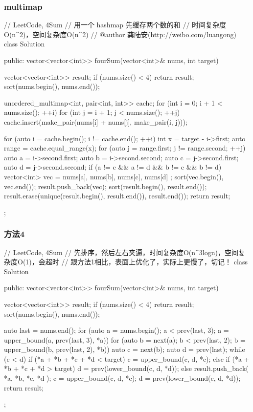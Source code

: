 \subsubsection{multimap}
\begin{Code}
// LeetCode, 4Sum
// 用一个 hashmap 先缓存两个数的和
// 时间复杂度O(n^2)，空间复杂度O(n^2)
// @author 龚陆安(http://weibo.com/luangong)
class Solution {
public:
    vector<vector<int>> fourSum(vector<int>& nums, int target) {
        vector<vector<int>> result;
        if (nums.size() < 4) return result;
        sort(nums.begin(), nums.end());

        unordered_multimap<int, pair<int, int>> cache;
        for (int i = 0; i + 1 < nums.size(); ++i)
            for (int j = i + 1; j < nums.size(); ++j)
                cache.insert(make_pair(nums[i] + nums[j], make_pair(i, j)));

        for (auto i = cache.begin(); i != cache.end(); ++i) {
            int x = target - i->first;
            auto range = cache.equal_range(x);
            for (auto j = range.first; j != range.second; ++j) {
                auto a = i->second.first;
                auto b = i->second.second;
                auto c = j->second.first;
                auto d = j->second.second;
                if (a != c && a != d && b != c && b != d) {
                    vector<int> vec = { nums[a], nums[b], nums[c], nums[d] };
                    sort(vec.begin(), vec.end());
                    result.push_back(vec);
                }
            }
        }
        sort(result.begin(), result.end());
        result.erase(unique(result.begin(), result.end()), result.end());
        return result;
    }
};
\end{Code}


\subsubsection{方法4}
\begin{Code}
// LeetCode, 4Sum
// 先排序，然后左右夹逼，时间复杂度O(n^3logn)，空间复杂度O(1)，会超时
// 跟方法1相比，表面上优化了，实际上更慢了，切记！
class Solution {
public:
    vector<vector<int>> fourSum(vector<int>& nums, int target) {
        vector<vector<int>> result;
        if (nums.size() < 4) return result;
        sort(nums.begin(), nums.end());

        auto last = nums.end();
        for (auto a = nums.begin(); a < prev(last, 3);
                a = upper_bound(a, prev(last, 3), *a)) {
            for (auto b = next(a); b < prev(last, 2);
                    b = upper_bound(b, prev(last, 2), *b)) {
                auto c = next(b);
                auto d = prev(last);
                while (c < d) {
                    if (*a + *b + *c + *d < target) {
                        c = upper_bound(c, d, *c);
                    } else if (*a + *b + *c + *d > target) {
                        d = prev(lower_bound(c, d, *d));
                    } else {
                        result.push_back({ *a, *b, *c, *d });
                        c = upper_bound(c, d, *c);
                        d = prev(lower_bound(c, d, *d));
                    }
                }
            }
        }
        return result;
    }
};
\end{Code}


